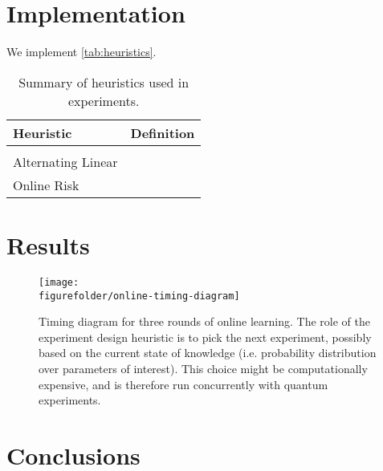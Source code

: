 \documentclass[aps,nofootinbib,prl,twocolumn,superscriptaddress]{revtex4}
\newcommand{\figurefolder}{../fig}
\begin{document}
\section{Implementation}
\label{sec:implementation}

We implement  \autoref{tab:heuristics}.

\begin{table*}[t]
    \centering
    \begin{tabularx}{\textwidth}{lX}
        \textbf{Heuristic} & \textbf{Definition} \\
        \hline \\
        Alternating Linear &  \\
        Online Risk
    \end{tabularx}
    \caption{Summary of heuristics used in experiments.}
    \label{tab:heuristics}
\end{table*}    

\section{Results}
\label{sec:results}

\begin{figure*}
    \texttt{[image: \\figurefolder/online-timing-diagram]}
    \caption{Timing diagram for three rounds of online learning. The role of the
    experiment design heuristic is to pick the next experiment, possibly based
    on the current state of knowledge (i.e. probability distribution over parameters
    of interest). This choice might be computationally expensive, and is 
    therefore run concurrently with quantum experiments.}
    \label{fig:online-timing-diagram}
\end{figure*}

\section{Conclusions}
\label{sec:conclusions}
\end{document}
